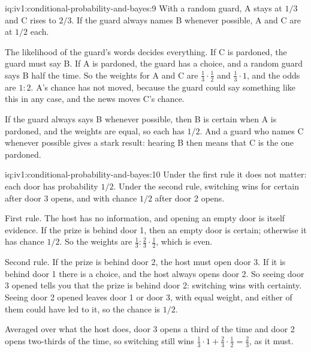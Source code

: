 \begin{solution}{iq:iv1:conditional-probability-and-bayes:9}
With a random guard, A stays at $1/3$ and C rises to $2/3$. If the guard always names B whenever possible, A and C are at $1/2$ each.

The likelihood of the guard's words decides everything. If C is pardoned, the guard must say B. If A is pardoned, the guard has a choice, and a random guard says B half the time. So the weights for A and C are $\tfrac13 \cdot \tfrac12$ and $\tfrac13 \cdot 1$, and the odds are $1 : 2$. A's chance has not moved, because the guard could say something like this in any case, and the news moves C's chance.

If the guard always says B whenever possible, then B is certain when A is pardoned, and the weights are equal, so each has $1/2$. And a guard who names C whenever possible gives a stark result: hearing B then means that C is the one pardoned.

\end{solution}

\begin{solution}{iq:iv1:conditional-probability-and-bayes:10}
Under the first rule it does not matter: each door has probability $1/2$. Under the second rule, switching wins for certain after door 3 opens, and with chance $1/2$ after door 2 opens.

First rule. The host has no information, and opening an empty door is itself evidence. If the prize is behind door 1, then an empty door is certain; otherwise it has chance $1/2$. So the weights are $\tfrac13 : \tfrac23 \cdot \tfrac12$, which is even.

Second rule. If the prize is behind door 2, the host must open door 3. If it is behind door 1 there is a choice, and the host always opens door 2. So seeing door 3 opened tells you that the prize is behind door 2: switching wins with certainty. Seeing door 2 opened leaves door 1 or door 3, with equal weight, and either of them could have led to it, so the chance is $1/2$.

Averaged over what the host does, door 3 opens a third of the time and door 2 opens two-thirds of the time, so switching still wins $\tfrac13 \cdot 1 + \tfrac23 \cdot \tfrac12 = \tfrac23$, as it must.

\end{solution}

